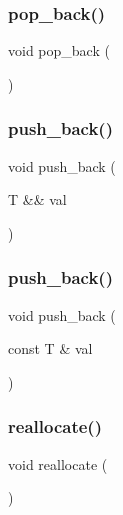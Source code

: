 \subsubsection{\texorpdfstring{pop\+\_\+back()}{pop\_back()}}
{\footnotesize\ttfamily void pop\+\_\+back (\begin{DoxyParamCaption}{ }\end{DoxyParamCaption})}

\mbox{\label{classvector_a1b36a29ecdb3c4f319332698a216115e}} 
\subsubsection{\texorpdfstring{push\+\_\+back()}{push\_back()}\hspace{0.1cm}{\footnotesize\ttfamily [1/2]}}
{\footnotesize\ttfamily void push\+\_\+back (\begin{DoxyParamCaption}\item[{T \&\&}]{val }\end{DoxyParamCaption})}

\mbox{\label{classvector_a8922d0954d738ead691e43d10c4f5d9f}} 
\subsubsection{\texorpdfstring{push\+\_\+back()}{push\_back()}\hspace{0.1cm}{\footnotesize\ttfamily [2/2]}}
{\footnotesize\ttfamily void push\+\_\+back (\begin{DoxyParamCaption}\item[{const T \&}]{val }\end{DoxyParamCaption})}

\mbox{\label{classvector_aa5cad3f031015371cc0bf94aa6a2e5c5}} 
\subsubsection{\texorpdfstring{reallocate()}{reallocate()}}
{\footnotesize\ttfamily void reallocate (\begin{DoxyParamCaption}{ }\end{DoxyParamCaption})\hspace{0.3cm}{\ttfamily [inline]}}

